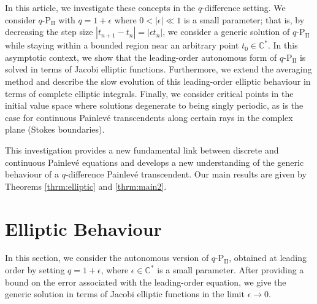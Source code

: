\documentclass[reqno,a4paper]{amsart}
\numberwithin{equation}{section}
\theoremstyle{plain}
\theoremstyle{remark}
\newcommand\Ptwo{\textrm{P}_{\textrm{II}}}
\begin{document}
In this article, we investigate these concepts in the $q$-difference setting. We consider $q$-$\Ptwo$ with $q=1+\epsilon$ where $0<|\epsilon|\ll1$ is a small parameter; that is, by decreasing the step size $|t_{n+1}-t_n|=|\epsilon t_n|$, we consider a generic solution of $q$-$\Ptwo$ while staying within a bounded region near an arbitrary point $t_0\in\mathbb{C}^*$. In this asymptotic context, we show that the leading-order autonomous form of $q$-$\Ptwo$ is solved in terms of Jacobi elliptic functions. Furthermore, we extend the averaging method and describe the slow evolution of this leading-order elliptic behaviour in terms of complete elliptic integrals. Finally, we consider critical points in the initial value space where solutions degenerate to being singly periodic, as is the case for continuous Painlev\'e transcendents along certain rays in the complex plane (Stokes boundaries).

This investigation provides a new fundamental link between discrete and continuous Painlev\'e equations and develops a new understanding of the generic behaviour of a $q$-difference Painlev\'e transcendent. Our main results are given by Theorems \ref{thrm:elliptic} and \ref{thrm:main2}.

\section{Elliptic Behaviour}
In this section, we consider the autonomous version of $q$-$\Ptwo$, obtained at leading order by setting $q=1+\epsilon$, where $\epsilon\in\mathbb{C}^*$ is a small parameter. After providing a bound on the error associated with the leading-order equation, we give the generic solution in terms of Jacobi elliptic functions in the limit $\epsilon\to0$.
\end{document}
